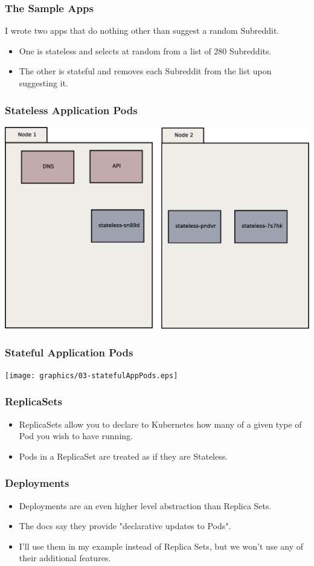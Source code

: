 \documentclass{beamer}
\begin{document}
\begin{frame}
\frametitle{The Sample Apps}
I wrote two apps that do nothing other than suggest a random Subreddit.
\begin{itemize}
    \item One is stateless and selects at random from a list of 280 Subreddits.
    \item The other is stateful and removes each Subreddit from the list upon suggesting it.
\end{itemize}
\end{frame}

\begin{frame}
    \frametitle{Stateless Application Pods}
    \includegraphics[width=\textwidth,height=0.85\textheight,keepaspectratio]{graphics/02-statelessAppPods.eps}
\end{frame}

\begin{frame}
    \frametitle{Stateful Application Pods}
    \texttt{[image: graphics/03-statefulAppPods.eps]}
\end{frame}

\begin{frame}
\frametitle{ReplicaSets}
\begin{itemize}    
    \item ReplicaSets allow you to declare to Kubernetes how many of a given type of Pod you wish to have running.
    \item Pods in a ReplicaSet are treated as if they are Stateless.
\end{itemize}
\end{frame}

\begin{frame}
    \frametitle{Deployments}
    \begin{itemize}
        \item Deployments are an even higher level abstraction than Replica Sets.
        \item The docs say they provide "declarative updates to Pods".
        \item I'll use them in my example instead of Replica Sets, but we won't use any of their additional features.
    \end{itemize}
\end{frame}
\end{document}
